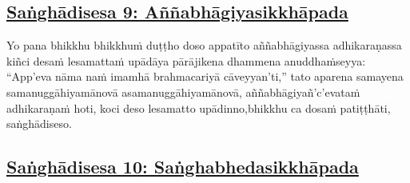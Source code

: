 \subsection*{\hyperref[comm9]{Saṅghādisesa 9: Aññabhāgiyasikkhāpada}}
\label{sd9}

Yo pana bhikkhu bhikkhuṁ duṭṭho doso appatīto aññabhāgiyassa adhikaraṇassa kiñci desaṁ lesamattaṁ upādāya pārājikena dhammena anuddhaṁseyya: ``App'eva nāma naṁ imamhā brahmacariyā cāveyyan'ti,'' tato aparena samayena samanuggāhiyamāno\makeatletter\hyperlink{endnote62-appendix}\makeatother \thinspace vā asamanuggāhiyamāno\makeatletter\hyperlink{endnote63-appendix}\makeatother \thinspace vā, aññabhāgiyañ'c'eva\makeatletter\hyperlink{endnote64-appendix}\makeatother \thinspace taṁ adhikaraṇaṁ hoti, koci deso lesamatto upādinno,\makeatletter\hyperlink{endnote65-appendix}\makeatother \thinspace bhikkhu ca dosaṁ patiṭṭhāti, saṅghādiseso.



\subsection*{\hyperref[comm10]{Saṅghādisesa 10: Saṅghabhedasikkhāpada}}
\label{sd10}

